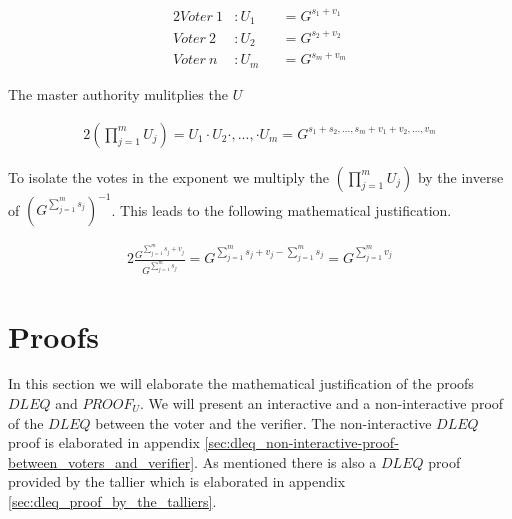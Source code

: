 \begin{alignat*}{2}
Voter \ 1 &: U_1 &&=G^{s_1+v_1}\\
Voter \ 2 &:U_2 &&=G^{s_2+v_2}\\
Voter \ n &:U_m &&=G^{s_m+v_m}
\end{alignat*}

\noindent
The  master  authority  mulitplies  the $U$

\begin{alignat*}{2}
(\prod\limits_{j=1}^{m} U_{j}) = U_1 \cdot U_2 \cdot,..., \cdot U_m = G^{s_1 + s_2,...,s_m + v_1 + v_2,..., v_m}
\end{alignat*}

\noindent
To isolate the votes in the exponent we multiply the  $(\prod\limits_{j=1}^{m} U_{j})$ by the inverse of $(G^{ \sum\limits_{j=1}^m s_j})^{-1}$. This leads to the following  mathematical justification.

\begin{alignat*}{2}
\frac{G^{ \sum\limits_{j=1}^m s_j +v_j}}{{ G^{ \sum\limits_{j=1}^m s_j} }} = G^{ \sum\limits_{j=1}^m s_j +v_j -\sum\limits_{j=1}^m s_j} = G^{ \sum\limits_{j=1}^m v_j}
\end{alignat*}


\section{Proofs} \label{sec:proofs}
In this section we will elaborate the mathematical justification of the proofs $DLEQ$ and $PROOF_U$. We will present an interactive and a non-interactive proof of the $DLEQ$ between the voter and the verifier. The non-interactive $DLEQ$ proof is elaborated in appendix \ref{sec:dleq_non-interactive-proof-between_voters_and_verifier}. As mentioned there is also a $DLEQ$ proof provided by the tallier which is elaborated in appendix \ref{sec:dleq_proof_by_the_talliers}.

